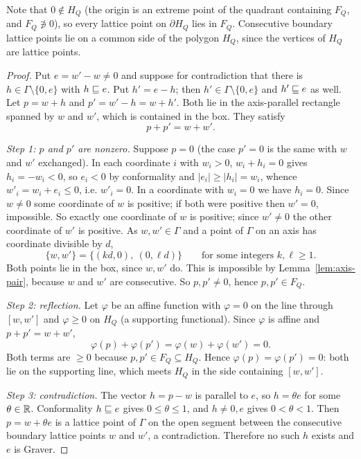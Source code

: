 Note that $0\notin H_Q$ (the origin is an extreme point of the quadrant containing $F_Q$, and $F_Q\not\ni0$), so every lattice point on $\partial H_Q$ lies in $F_Q$. Consecutive boundary lattice points lie on a common side of the polygon $H_Q$, since the vertices of $H_Q$ are lattice points.

\begin{proof}
Put $e=w'-w\ne0$ and suppose for contradiction that there is $h\in\Gamma\setminus\{0,e\}$ with $h\sqsubseteq e$. Put $h'=e-h$; then $h'\in\Gamma\setminus\{0,e\}$ and $h'\sqsubseteq e$ as well. Let $p=w+h$ and $p'=w'-h=w+h'$. Both lie in the axis-parallel rectangle spanned by $w$ and $w'$, which is contained in the box. They satisfy
\[
  p+p'=w+w'.
\]

\emph{Step 1: $p$ and $p'$ are nonzero.} Suppose $p=0$ (the case $p'=0$ is the same with $w$ and $w'$ exchanged). In each coordinate $i$ with $w_i>0$, $w_i+h_i=0$ gives $h_i=-w_i<0$, so $e_i<0$ by conformality and $|e_i|\ge|h_i|=w_i$, whence $w'_i=w_i+e_i\le0$, i.e. $w'_i=0$. In a coordinate with $w_i=0$ we have $h_i=0$. Since $w\ne0$ some coordinate of $w$ is positive; if both were positive then $w'=0$, impossible. So exactly one coordinate of $w$ is positive; since $w'\ne0$ the other coordinate of $w'$ is positive. As $w,w'\in\Gamma$ and a point of $\Gamma$ on an axis has coordinate divisible by $d$,
\[
  \{w,w'\}=\{(kd,0),\ (0,\ell d)\}\qquad\text{for some integers }k,\ell\ge1.
\]
Both points lie in the box, since $w,w'$ do. This is impossible by Lemma~\ref{lem:axis-pair}, because $w$ and $w'$ are consecutive. So $p,p'\ne0$, hence $p,p'\in F_Q$.

\emph{Step 2: reflection.} Let $\varphi$ be an affine function with $\varphi=0$ on the line through $[w,w']$ and $\varphi\ge0$ on $H_Q$ (a supporting functional). Since $\varphi$ is affine and $p+p'=w+w'$,
\[
  \varphi(p)+\varphi(p')=\varphi(w)+\varphi(w')=0.
\]
Both terms are $\ge0$ because $p,p'\in F_Q\subseteq H_Q$. Hence $\varphi(p)=\varphi(p')=0$: both lie on the supporting line, which meets $H_Q$ in the side containing $[w,w']$.

\emph{Step 3: contradiction.} The vector $h=p-w$ is parallel to $e$, so $h=\theta e$ for some $\theta\in\mathbb R$. Conformality $h\sqsubseteq e$ gives $0\le\theta\le1$, and $h\ne0,e$ gives $0<\theta<1$. Then $p=w+\theta e$ is a lattice point of $\Gamma$ on the open segment between the consecutive boundary lattice points $w$ and $w'$, a contradiction. Therefore no such $h$ exists and $e$ is Graver.
\end{proof}

